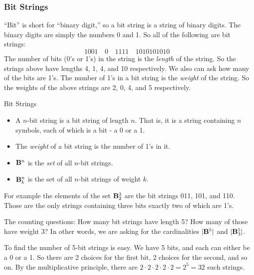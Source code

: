 \documentclass[12pt]{article}
\begin{document}
\subsubsection*{Bit Strings}

``Bit'' is short for ``binary digit,'' so a bit string is a string of binary digits.  The binary digits are simply the numbers 0 and 1.  So all of the following are bit strings:
\[1001 \quad 0 \quad 1111 \quad 1010101010\]
The number of bits (0's or 1's) in the string is the {\em length} of the string.  So the strings above have lengths 4, 1, 4, and 10 respectively.  We also can ask how many of the bits are 1's.  The number of 1's in a bit string is the {\em weight} of the string.  So the weights of the above strings are 2, 0, 4, and 5 respectively.

\begin{defbox}{Bit Strings}
\vspace{-3ex}
  \begin{itemize}
    \item A $n$-bit string is a bit string of length $n$.  That is, it is a string containing $n$ symbols, each of which is a bit - a 0 or a 1.
    \item The {\em weight} of a bit string is the number of 1's in it.
    \item $\mathbf{B}^n$ is the {\em set} of all $n$-bit strings.
    \item $\mathbf{B}^n_k$ is the set of all $n$-bit strings of weight $k$.
  \end{itemize}
\end{defbox}

For example the elements of the set $\mathbf{B}^3_2$ are the bit strings 011, 101, and 110.  Those are the only strings containing three bits exactly two of which are 1's.

The counting questions: How many bit strings have length 5?  How many of those have weight 3?  In other words, we are asking for the cardinalities $|\mathbf{B}^5|$ and $|\mathbf{B}^5_3|$.  

To find the number of 5-bit strings is easy.  We have 5 bits, and each can either be a 0 or a 1.  So there are 2 choices for the first bit, 2 choices for the second, and so on.  By the multiplicative principle, there are $2 \cdot 2 \cdot 2\cdot 2 \cdot 2 = 2^5 = 32$ such strings.  
\end{document}
